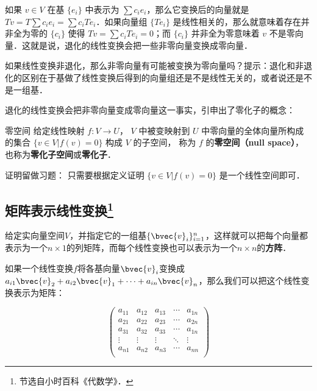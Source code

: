 如果 ${v}\in V$ 在基 $\{{e}_i\}$ 中表示为 $\sum c_i {e}_i$，那么它变换后的向量就是 $T {v}=T\sum c_i {e}_i=\sum c_iT {e}_i$．如果向量组 $\{T {e}_i\}$ 是线性相关的，那么就意味着存在并非全为零的 $\{c_i\}$ 使得 $T {v}=\sum c_iT {e}_i=0$；而 $\{c_i\}$ 并非全为零意味着 ${v}$ 不是零向量．这就是说，退化的线性变换会把一些非零向量变换成零向量．

\begin{exercise}{}
如果线性变换非退化，那么非零向量有可能被变换为零向量吗？提示：退化和非退化的区别在于基做了线性变换后得到的向量组还是不是线性无关的，或者说还是不是一组基．
\end{exercise}

退化的线性变换会把非零向量变成零向量这一事实，引申出了零化子的概念：

\begin{theorem}{零空间}\label{LinMap_the1}
给定线性映射 $f:V\to U$， $V$ 中被变映射到 $U$ 中零向量的全体向量所构成的集合 $\{{v}\in V|f(v)= 0\}$ 构成 $V$ 的子空间， 称为 $f$ 的\textbf{零空间（null space）}， 也称为\textbf{零化子空间}或\textbf{零化子}．
\end{theorem}
证明留做习题： 只需要根据定义证明 $\{{v}\in V|f(v)= 0\}$ 是一个线性空间即可． 



\subsection{矩阵表示线性变换\footnote{节选自小时百科《代数学》．}}

给定实向量空间$V$，并指定它的一组基$\{\bvec{v}_i\}_{i=1}^n$，这样就可以把每个向量都表示为一个$n\times 1$的列矩阵，而每个线性变换也可以表示为一个$n\times n$的\textbf{方阵}．

如果一个线性变换$f$将各基向量$\bvec{v}_i$变换成$a_{i1}\bvec{v}_2+a_{i2}\bvec{v}_1+\cdots+a_{in}\bvec{v}_n$，那么我们可以把这个线性变换表示为矩阵：

\begin{equation}
    \begin{pmatrix}
    a_{11}&a_{12}&a_{13}&\cdots&a_{1n}\\
    a_{21}&a_{22}&a_{23}&\cdots&a_{2n}\\
    a_{31}&a_{32}&a_{33}&\cdots&a_{1n}\\
    \vdots&\vdots&\vdots&\ddots&\vdots\\
    a_{n1}&a_{n2}&a_{n3}&\cdots&a_{nn}\\
    \end{pmatrix}
\end{equation}

